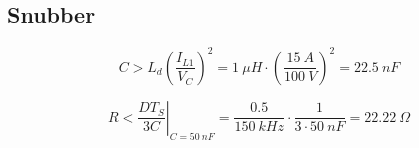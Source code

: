 



\subsection{Snubber}

\begin{equation}
	C > L_d \left( \frac{I_{L1}}{V_{C}} \right)^2 = 1 \ \mu H \cdot \left( \frac{15 \ A}{100 \ V} \right)^2 = 22.5 \ nF
\end{equation}

\begin{equation}
	R < \left. \frac{DT_S}{3C} \right|_{C = 50 \ nF} = \frac{0.5}{150 \ kHz} \cdot \frac{1}{3 \cdot 50 \ nF} = 22.22 \ \Omega
\end{equation}

